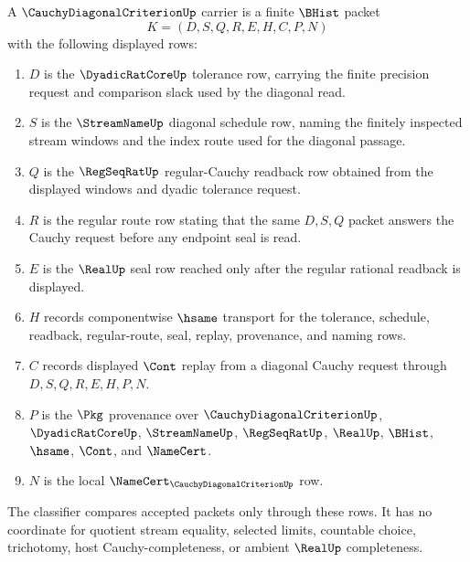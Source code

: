 \begin{definition}
\label{def:cauchy-diagonal-criterion-carrier}
A $\CauchyDiagonalCriterionUp$ carrier is a finite $\BHist$ packet
$$
K=(D,S,Q,R,E,H,C,P,N)
$$
with the following displayed rows:
\begin{enumerate}
\item $D$ is the $\DyadicRatCoreUp$ tolerance row, carrying the finite precision request and comparison slack used by the diagonal read.
\item $S$ is the $\StreamNameUp$ diagonal schedule row, naming the finitely inspected stream windows and the index route used for the diagonal passage.
\item $Q$ is the $\RegSeqRatUp$ regular-Cauchy readback row obtained from the displayed windows and dyadic tolerance request.
\item $R$ is the regular route row stating that the same $D,S,Q$ packet answers the Cauchy request before any endpoint seal is read.
\item $E$ is the $\RealUp$ seal row reached only after the regular rational readback is displayed.
\item $H$ records componentwise $\hsame$ transport for the tolerance, schedule, readback, regular-route, seal, replay, provenance, and naming rows.
\item $C$ records displayed $\Cont$ replay from a diagonal Cauchy request through $D,S,Q,R,E,H,P,N$.
\item $P$ is the $\Pkg$ provenance over $\CauchyDiagonalCriterionUp$, $\DyadicRatCoreUp$, $\StreamNameUp$, $\RegSeqRatUp$, $\RealUp$, $\BHist$, $\hsame$, $\Cont$, and $\NameCert$.
\item $N$ is the local $\NameCert_{\CauchyDiagonalCriterionUp}$ row.
\end{enumerate}
The classifier compares accepted packets only through these rows. It has no coordinate for quotient stream equality, selected limits, countable choice, trichotomy, host Cauchy-completeness, or ambient $\RealUp$ completeness.
\end{definition}


